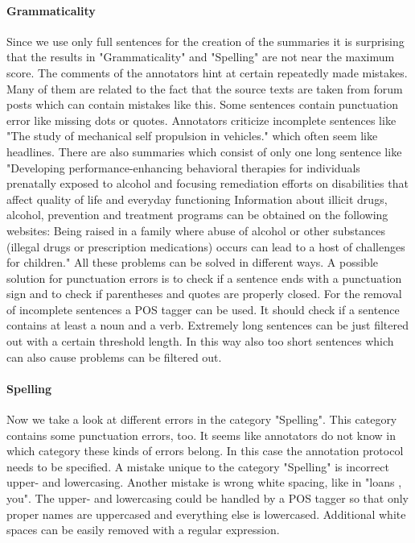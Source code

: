 \paragraph{Grammaticality}
Since we use only full sentences for the creation of the summaries it is surprising that the results in "Grammaticality" and "Spelling" are not near the maximum score. The comments of the annotators hint at certain repeatedly made mistakes. Many of them are related to the fact that the source texts are taken from forum posts which can contain mistakes like this. Some sentences contain punctuation error like missing dots or quotes. Annotators criticize incomplete sentences like "The study of mechanical self propulsion in vehicles." which often seem like headlines.  There are also summaries which consist of only one long sentence like "Developing performance-enhancing behavioral therapies for individuals prenatally exposed to alcohol and focusing remediation efforts on disabilities that affect quality of life and everyday functioning Information about illicit drugs, alcohol, prevention and treatment programs can be obtained on the following websites: Being raised in a family where abuse of alcohol or other substances (illegal drugs or prescription medications) occurs can lead to a host of challenges for children." All these problems can be solved in different ways. A possible solution for punctuation errors is to check if a sentence ends with a punctuation sign and to check if parentheses and quotes are properly closed. For the removal of incomplete sentences a POS tagger can be used. It should check if a sentence contains at least a noun and a verb. Extremely long sentences can be just filtered out with a certain threshold length. In this way also too short sentences which can also cause problems can be filtered out.

\paragraph{Spelling}
Now we take a look at different errors in the category "Spelling". This category contains some punctuation errors, too. It seems like annotators do not know in which category these kinds of errors belong. In this case the annotation protocol needs to be specified. A mistake unique to the category "Spelling" is incorrect upper- and lowercasing. Another mistake is wrong white spacing, like in "loans , you". The upper- and lowercasing could be handled by a POS tagger so that only proper names are uppercased and everything else is lowercased. Additional white spaces can be easily removed with a regular expression.

